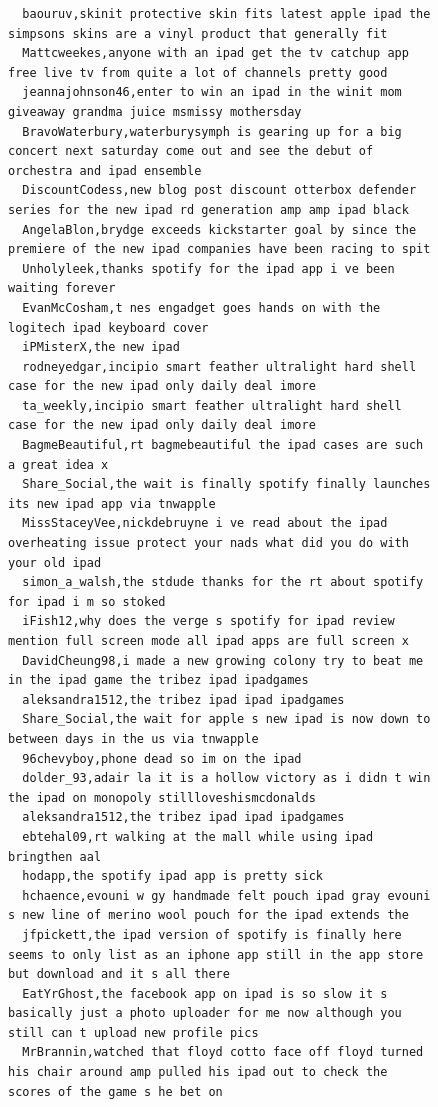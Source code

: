 \begin{figure}[htpb]
\begin{verbatim}
  baouruv,skinit protective skin fits latest apple ipad the simpsons skins are a vinyl product that generally fit
  Mattcweekes,anyone with an ipad get the tv catchup app free live tv from quite a lot of channels pretty good
  jeannajohnson46,enter to win an ipad in the winit mom giveaway grandma juice msmissy mothersday
  BravoWaterbury,waterburysymph is gearing up for a big concert next saturday come out and see the debut of orchestra and ipad ensemble
  DiscountCodess,new blog post discount otterbox defender series for the new ipad rd generation amp amp ipad black
  AngelaBlon,brydge exceeds kickstarter goal by since the premiere of the new ipad companies have been racing to spit
  Unholyleek,thanks spotify for the ipad app i ve been waiting forever
  EvanMcCosham,t nes engadget goes hands on with the logitech ipad keyboard cover
  iPMisterX,the new ipad
  rodneyedgar,incipio smart feather ultralight hard shell case for the new ipad only daily deal imore
  ta_weekly,incipio smart feather ultralight hard shell case for the new ipad only daily deal imore
  BagmeBeautiful,rt bagmebeautiful the ipad cases are such a great idea x
  Share_Social,the wait is finally spotify finally launches its new ipad app via tnwapple
  MissStaceyVee,nickdebruyne i ve read about the ipad overheating issue protect your nads what did you do with your old ipad
  simon_a_walsh,the stdude thanks for the rt about spotify for ipad i m so stoked
  iFish12,why does the verge s spotify for ipad review mention full screen mode all ipad apps are full screen x
  DavidCheung98,i made a new growing colony try to beat me in the ipad game the tribez ipad ipadgames
  aleksandra1512,the tribez ipad ipad ipadgames
  Share_Social,the wait for apple s new ipad is now down to between days in the us via tnwapple
  96chevyboy,phone dead so im on the ipad
  dolder_93,adair la it is a hollow victory as i didn t win the ipad on monopoly stillloveshismcdonalds
  aleksandra1512,the tribez ipad ipad ipadgames
  ebtehal09,rt walking at the mall while using ipad bringthen aal
  hodapp,the spotify ipad app is pretty sick
  hchaence,evouni w gy handmade felt pouch ipad gray evouni s new line of merino wool pouch for the ipad extends the
  jfpickett,the ipad version of spotify is finally here seems to only list as an iphone app still in the app store but download and it s all there
  EatYrGhost,the facebook app on ipad is so slow it s basically just a photo uploader for me now although you still can t upload new profile pics
  MrBrannin,watched that floyd cotto face off floyd turned his chair around amp pulled his ipad out to check the scores of the game s he bet on

\end{verbatim}
\end{figure}
